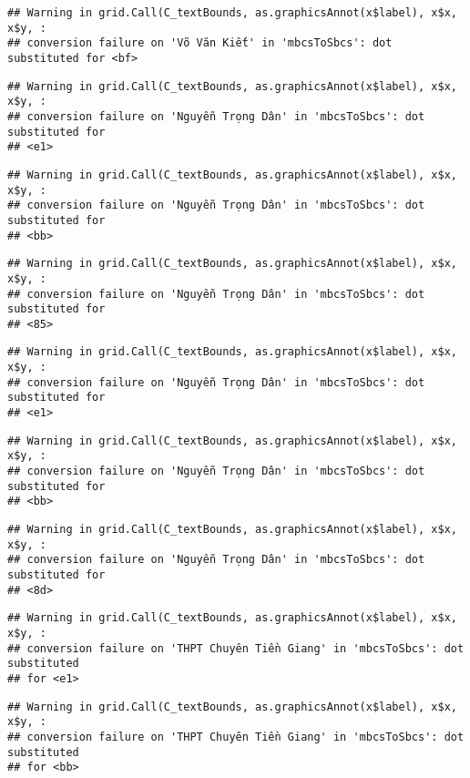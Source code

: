 \documentclass[
]{article}
\begin{document}
\begin{verbatim}
## Warning in grid.Call(C_textBounds, as.graphicsAnnot(x$label), x$x, x$y, :
## conversion failure on 'Võ Văn Kiết' in 'mbcsToSbcs': dot substituted for <bf>
\end{verbatim}

\begin{verbatim}
## Warning in grid.Call(C_textBounds, as.graphicsAnnot(x$label), x$x, x$y, :
## conversion failure on 'Nguyễn Trọng Dân' in 'mbcsToSbcs': dot substituted for
## <e1>
\end{verbatim}

\begin{verbatim}
## Warning in grid.Call(C_textBounds, as.graphicsAnnot(x$label), x$x, x$y, :
## conversion failure on 'Nguyễn Trọng Dân' in 'mbcsToSbcs': dot substituted for
## <bb>
\end{verbatim}

\begin{verbatim}
## Warning in grid.Call(C_textBounds, as.graphicsAnnot(x$label), x$x, x$y, :
## conversion failure on 'Nguyễn Trọng Dân' in 'mbcsToSbcs': dot substituted for
## <85>
\end{verbatim}

\begin{verbatim}
## Warning in grid.Call(C_textBounds, as.graphicsAnnot(x$label), x$x, x$y, :
## conversion failure on 'Nguyễn Trọng Dân' in 'mbcsToSbcs': dot substituted for
## <e1>
\end{verbatim}

\begin{verbatim}
## Warning in grid.Call(C_textBounds, as.graphicsAnnot(x$label), x$x, x$y, :
## conversion failure on 'Nguyễn Trọng Dân' in 'mbcsToSbcs': dot substituted for
## <bb>
\end{verbatim}

\begin{verbatim}
## Warning in grid.Call(C_textBounds, as.graphicsAnnot(x$label), x$x, x$y, :
## conversion failure on 'Nguyễn Trọng Dân' in 'mbcsToSbcs': dot substituted for
## <8d>
\end{verbatim}

\begin{verbatim}
## Warning in grid.Call(C_textBounds, as.graphicsAnnot(x$label), x$x, x$y, :
## conversion failure on 'THPT Chuyên Tiền Giang' in 'mbcsToSbcs': dot substituted
## for <e1>
\end{verbatim}

\begin{verbatim}
## Warning in grid.Call(C_textBounds, as.graphicsAnnot(x$label), x$x, x$y, :
## conversion failure on 'THPT Chuyên Tiền Giang' in 'mbcsToSbcs': dot substituted
## for <bb>
\end{verbatim}
\end{document}
